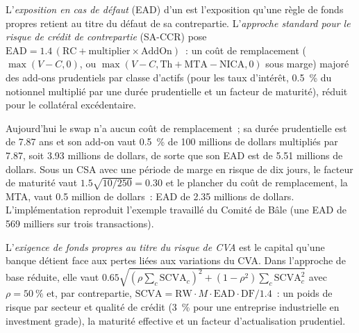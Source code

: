 \begin{definition}\label{def:rc:funding-margin-and-capital-adjustments:saccr}
L'\emph{exposition en cas de défaut} (EAD) d'un  est l'exposition
qu'une règle de fonds propres retient au titre du défaut de sa contrepartie. L'\emph{approche standard
pour le risque de crédit de contrepartie}
(SA-CCR) pose $\mathrm{EAD} = 1.4\,(\mathrm{RC}+\mathrm{multiplier}\times\mathrm{AddOn})$~: un coût de remplacement
($\max(V-C,0)$, ou $\max(V-C,\mathrm{Th}+\mathrm{MTA}-\mathrm{NICA},0)$ sous marge) majoré des add-ons prudentiels
par classe d'actifs (pour les taux d'intérêt, 0.5~\% du notionnel multiplié par une durée prudentielle et un
facteur de maturité), réduit pour le collatéral excédentaire.
\end{definition}

\label{lst:rc:funding-margin-and-capital-adjustments:saccr}

\begin{example}\label{ex:rc:funding-margin-and-capital-adjustments:ead}
Aujourd'hui le swap n'a aucun coût de remplacement~; sa durée prudentielle est de 7.87 ans et son add-on vaut
0.5~\% de 100 millions de dollars multipliés par 7.87, soit 3.93 millions de dollars, de sorte que son EAD est de 5.51 millions de dollars. Sous un
CSA avec une période de marge en risque de dix jours, le facteur de maturité vaut $1.5\sqrt{10/250} = 0.30$ et
le plancher du coût de remplacement, la MTA, vaut 0.5 million de dollars~: EAD de 2.35 millions de dollars. L'implémentation
reproduit l'exemple travaillé du Comité de Bâle (une EAD de 569 milliers sur trois transactions).
\end{example}

\begin{definition}\label{def:rc:funding-margin-and-capital-adjustments:cvacap}
L'\emph{exigence de fonds propres au titre du risque de CVA} est le capital qu'une banque détient face aux pertes
liées aux variations du CVA. Dans l'approche de base réduite, elle vaut $0.65\sqrt{(\rho\sum_c\mathrm{SCVA}_c)^2+(1-\rho^2)\sum_c\mathrm{SCVA}_c^2}$
avec $\rho = 50~\%$ et, par contrepartie, $\mathrm{SCVA} = \mathrm{RW}\cdot M\cdot\mathrm{EAD}\cdot\mathrm{DF}/1.4$~: un poids de risque par secteur et
qualité de crédit (3~\% pour une entreprise industrielle en investment grade), la maturité effective et un
facteur d'actualisation prudentiel.
\end{definition}

